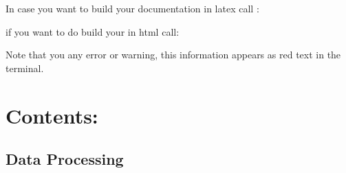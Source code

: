 \documentclass[a4paper,11pt,english]{sphinxmanual}
\begin{document}
In case you want to build your documentation in latex call :

\begin{sphinxVerbatim}[commandchars=\\\{\}]
 
\end{sphinxVerbatim}

if you want to do build your in html call:

\begin{sphinxVerbatim}[commandchars=\\\{\}]
 
\end{sphinxVerbatim}

Note that you  any error or warning, this information appears as red text in the terminal.


\chapter{Contents:}
\label{\detokenize{index:contents}}

\section{Data Processing}
\label{\detokenize{modules:module-envlib.extract_data}}\label{\detokenize{modules:data-processing}}\label{\detokenize{modules::doc}}
\end{document}
